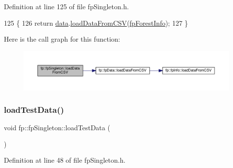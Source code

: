 Definition at line 125 of file fp\+Singleton.\+h.


\begin{DoxyCode}
125                                          \{
126                 \textcolor{keywordflow}{return} \hyperlink{classfp_1_1fpSingleton_a2fa16ac6a0f66641749032eeee61b8e9}{data}.\hyperlink{classfp_1_1fpData_a2b4d9be328aaa7acf9a2561150da0402}{loadDataFromCSV}(\hyperlink{classfp_1_1fpSingleton_a85965009befa72a749ae498fa5b6ccfa}{fpForestInfo});
127             \}
\end{DoxyCode}
Here is the call graph for this function\+:\nopagebreak
\begin{figure}[H]
\begin{center}
\leavevmode
\includegraphics[width=350pt]{classfp_1_1fpSingleton_a12178de58f19494062efe5255d937171_cgraph}
\end{center}
\end{figure}
\mbox{\label{classfp_1_1fpSingleton_aea7c3b65ded387322d7d5ce48ab96215}} 
\subsubsection{\texorpdfstring{load\+Test\+Data()}{loadTestData()}}
{\footnotesize\ttfamily void fp\+::fp\+Singleton\+::load\+Test\+Data (\begin{DoxyParamCaption}{ }\end{DoxyParamCaption})\hspace{0.3cm}{\ttfamily [inline]}}



Definition at line 48 of file fp\+Singleton.\+h.


